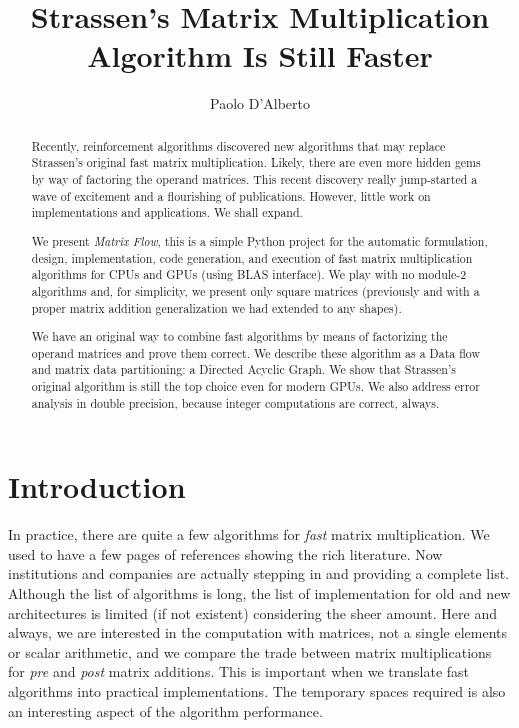 \documentclass[acmsmall]{acmart}
\begin{document}
\title{Strassen's Matrix Multiplication Algorithm Is Still Faster}

\author{Paolo D'Alberto}
\email{}

\renewcommand{\shortauthors}{D'Alberto et al.}

\begin{abstract}
  Recently, reinforcement algorithms discovered new algorithms that
  may replace Strassen's original fast matrix multiplication. Likely,
  there are even more hidden gems by way of factoring the operand
  matrices. This recent discovery really jump-started a wave of
  excitement and a flourishing of publications. However, little work
  on implementations and applications. We shall expand.

  We present {\em Matrix Flow}, this is a simple Python project for
  the automatic formulation, design, implementation, code generation,
  and execution of fast matrix multiplication algorithms for CPUs and
  GPUs (using BLAS interface). We play with no module-2 algorithms
  and, for simplicity, we present only square matrices (previously and
  with a proper matrix addition generalization we had extended to any
  shapes).

  We have an original way to combine fast algorithms by means of
  factorizing the operand matrices and prove them correct. We describe
  these algorithm as a Data flow and matrix data partitioning: a
  Directed Acyclic Graph. We show that Strassen's original algorithm
  is still the top choice even for modern GPUs. We also address error
  analysis in double precision, because integer computations are
  correct, always.
\end{abstract}

\maketitle

\section{Introduction} 
\label{sec:introduction}
In practice, there are quite a few algorithms for {\em fast} matrix
multiplication. We used to have a few pages of references showing the
rich literature. Now institutions and companies are actually stepping
in and providing a complete list. Although the list of algorithms is
long, the list of implementation for old and new architectures is
limited (if not existent) considering the sheer amount. Here and
always, we are interested in the computation with matrices, not a
single elements or scalar arithmetic, and we compare the trade between
matrix multiplications for {\em pre} and {\em post} matrix additions.
This is important when we translate fast algorithms into practical
implementations. The temporary spaces required is also an interesting
aspect of the algorithm performance.
\end{document}
